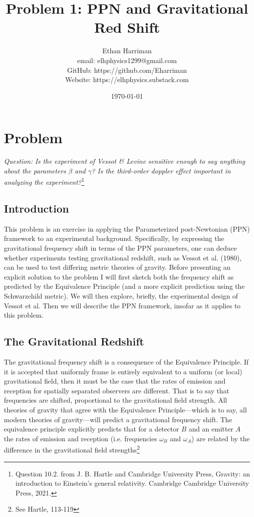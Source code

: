 \documentclass[11pt]{article}
\title{Problem 1: PPN and Gravitational Red Shift}
\author{Ethan Harriman \\ email: elhphysics1299@gmail.com \\ GitHub: https://github.com/Eharriman \\ Website: https://elhphysics.substack.com}
\date{\today}
\begin{document}
\maketitle

\section{Problem}

\textit{Question: Is the experiment of Vessot \& Levine sensitive enough to say anything about the parameters $\beta$ and $\gamma$? Is the third-order doppler effect important in analyzing the experiment?}\footnote{Question 10.2. from J. B. Hartle and Cambridge University Press, Gravity: an introduction to Einstein’s general relativity. Cambridge Cambridge University Press, 2021.}\\

\subsection{Introduction}

This problem is an exercise in applying the Parameterized post-Newtonian (PPN) framework to an experimental background. Specifically, by expressing the gravitational frequency shift in terms of the PPN parameters, one can deduce whether experiments testing gravitational redshift, such as Vessot et al. (1980), can be used to test differing metric theories of gravity. Before presenting an explicit solution to the problem I will first sketch both the frequency shift as predicted by the Equivalence Principle (and a more explicit prediction using the Schwarzchild metric). We will then explore, briefly, the experimental design of Vessot et al. Then we will describe the PPN framework, insofar as it applies to this problem.

\subsection{The Gravitational Redshift}
The gravitational frequency shift is a consequence of the Equivalence Principle. If it is accepted that uniformly frame is entirely equivalent to a uniform (or local) gravitational field, then it must be the case that the rates of emission and reception for spatially separated observers are different. That is to say that frequencies are shifted, proportional to the gravitational field strength. All theories of gravity that agree with the Equivalence Principle—which is to say, all modern theories of gravity—will predict a gravitational frequency shift. The equivalence principle explicitly predicts that for a detector $B$ and an emitter $A$ the rates of emission and reception (i.e. frequencies $\omega_B$ and $\omega_A$) are related by the difference in the gravitational field strengths\footnote{See Hartle, 113-119}
\end{document}
